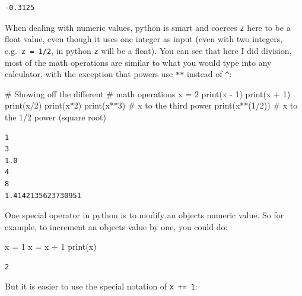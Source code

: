 \documentclass[
  letterpaper,
]{scrbook}
\newenvironment{Shaded}{\begin{snugshade}}{\end{snugshade}}
\newcommand{\BuiltInTok}[1]{\textcolor[rgb]{0.00,0.23,0.31}{#1}}
\newcommand{\CommentTok}[1]{\textcolor[rgb]{0.37,0.37,0.37}{#1}}
\newcommand{\DecValTok}[1]{\textcolor[rgb]{0.68,0.00,0.00}{#1}}
\newcommand{\NormalTok}[1]{\textcolor[rgb]{0.00,0.23,0.31}{#1}}
\newcommand{\OperatorTok}[1]{\textcolor[rgb]{0.37,0.37,0.37}{#1}}
\begin{document}
\begin{verbatim}
-0.3125
\end{verbatim}

When dealing with numeric values, python is smart and coerces \texttt{z}
here to be a float value, even though it uses one integer as input (even
with two integers, e.g.~\texttt{z\ =\ 1/2}, in python \texttt{z} will be
a float). You can see that here I did division, most of the math
operations are similar to what you would type into any calculator, with
the exception that powers use \texttt{**} instead of \texttt{\^{}}:

\begin{Shaded}
\begin{Highlighting}[]
\CommentTok{\# Showing off the different}
\CommentTok{\# math operations}
\NormalTok{x }\OperatorTok{=} \DecValTok{2}
\BuiltInTok{print}\NormalTok{(x }\OperatorTok{{-}} \DecValTok{1}\NormalTok{)}
\BuiltInTok{print}\NormalTok{(x }\OperatorTok{+} \DecValTok{1}\NormalTok{)}
\BuiltInTok{print}\NormalTok{(x}\OperatorTok{/}\DecValTok{2}\NormalTok{)}
\BuiltInTok{print}\NormalTok{(x}\OperatorTok{*}\DecValTok{2}\NormalTok{)}
\BuiltInTok{print}\NormalTok{(x}\OperatorTok{**}\DecValTok{3}\NormalTok{)      }\CommentTok{\# x to the third power}
\BuiltInTok{print}\NormalTok{(x}\OperatorTok{**}\NormalTok{(}\DecValTok{1}\OperatorTok{/}\DecValTok{2}\NormalTok{))  }\CommentTok{\# x to the 1/2 power (square root)}
\end{Highlighting}
\end{Shaded}

\begin{verbatim}
1
3
1.0
4
8
1.4142135623730951
\end{verbatim}

One special operator in python is to modify an objects numeric value. So
for example, to increment an objects value by one, you could do:

\begin{Shaded}
\begin{Highlighting}[]
\NormalTok{x }\OperatorTok{=} \DecValTok{1}
\NormalTok{x }\OperatorTok{=}\NormalTok{ x }\OperatorTok{+} \DecValTok{1}
\BuiltInTok{print}\NormalTok{(x)}
\end{Highlighting}
\end{Shaded}

\begin{verbatim}
2
\end{verbatim}

But it is easier to use the special notation of \texttt{x\ +=\ 1}:
\end{document}
